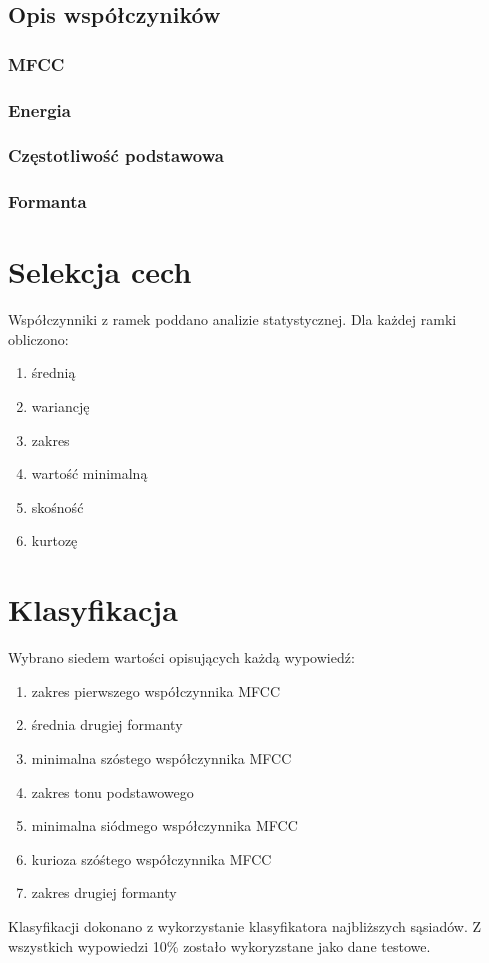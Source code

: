 \documentclass[a4paper,12pt,twoside,openany]{report}
\begin{document}
    \subsection{Opis współczyników}
    \subsubsection{MFCC}
    \subsubsection{Energia}
    \subsubsection{Częstotliwość podstawowa}
    \subsubsection{Formanta}
    \section{Selekcja cech}
    Współczynniki z ramek poddano analizie statystycznej.
    Dla każdej ramki obliczono:
    \begin{enumerate}
        \item średnią
        \item wariancję
        \item zakres
        \item wartość minimalną
        \item skośność
        \item kurtozę
    \end{enumerate}

    \section{Klasyfikacja}
    Wybrano siedem wartości opisujących każdą wypowiedź:
    \begin{enumerate}
        \item zakres pierwszego współczynnika MFCC
        \item średnia drugiej formanty
        \item minimalna szóstego współczynnika MFCC
        \item zakres tonu podstawowego
        \item minimalna siódmego współczynnika MFCC
        \item kurioza szóśtego współczynnika MFCC
        \item zakres drugiej formanty
    \end{enumerate}
    Klasyfikacji dokonano z wykorzystanie klasyfikatora najbliższych sąsiadów.
    Z wszystkich wypowiedzi 10\% zostało wykoryzstane jako dane testowe.
\end{document}
